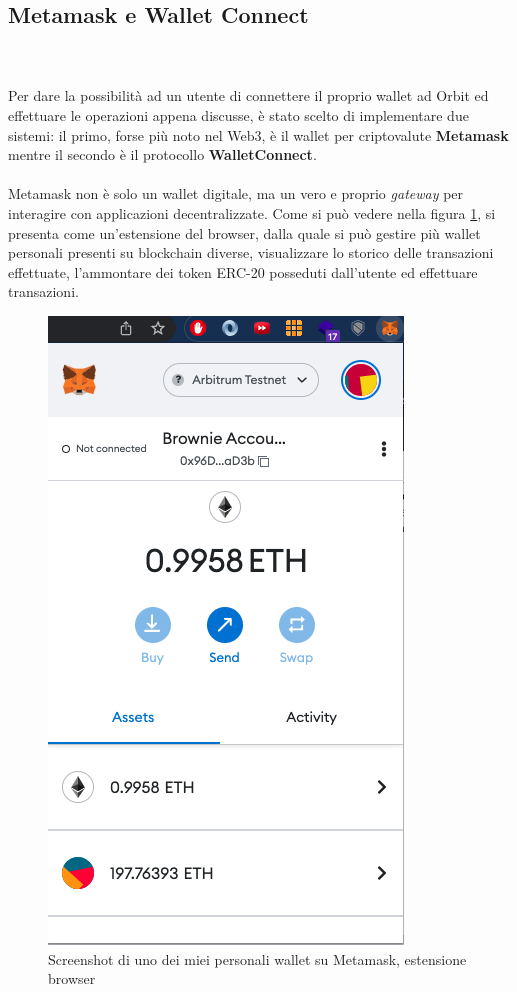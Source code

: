 \documentclass[12pt,a4paper]{report}
\begin{document}
\subsection{Metamask e Wallet Connect}
\\\\Per dare la possibilità ad un utente di connettere il proprio wallet ad Orbit ed effettuare le operazioni appena discusse, è stato scelto di implementare due sistemi: il primo, forse più noto nel Web3, è il wallet per criptovalute \textbf{Metamask}\cite{metamask} mentre il secondo è il protocollo \textbf{WalletConnect}\cite{walletconnect}.
\\\\Metamask non è solo un wallet digitale, ma un vero e proprio \textit{gateway} per interagire con applicazioni decentralizzate. Come si può vedere nella figura \ref{fig:metamask}, si presenta come un'estensione del browser, dalla quale si può gestire più wallet personali presenti su blockchain diverse, visualizzare lo storico delle transazioni effettuate, l'ammontare dei token ERC-20 posseduti dall'utente ed effettuare transazioni.\\
\begin{figure}[H]
  \includegraphics[scale=0.6]{metamask.png}
  \centering
  \caption{Screenshot di uno dei miei personali wallet su Metamask, estensione browser}
  \label{fig:metamask}
\end{figure}
\end{document}

